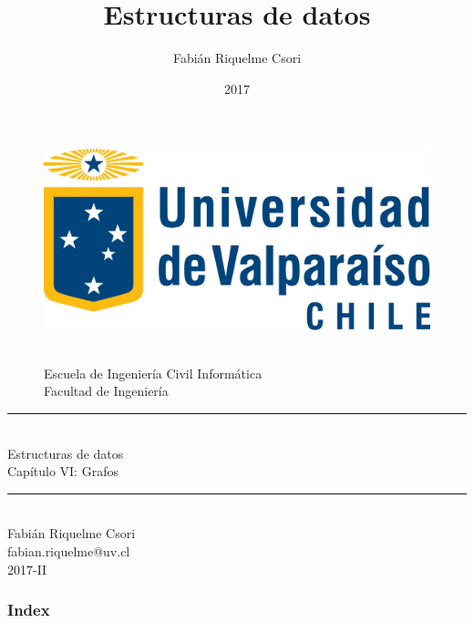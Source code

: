 \documentclass{beamer} %
\title{Estructuras de datos}   %
\author{Fabián Riquelme Csori} %
\date{2017}                    %
\institute{Universidad de Valparaíso}                 %
\newcommand{\HRule}{\rule{\linewidth}{0.2mm}\\[1ex]}
\begin{document}
%

\begin{frame}[plain]
  \begin{figure}[h]
    \begin{minipage}{0.3\textwidth}
    \includegraphics[width=.9\textwidth]{./image/logo-UV.png}
    \end{minipage}
    \begin{minipage}{0.65\textwidth}
     $~$\\[3.6ex]
     \footnotesize{Escuela de Ingeniería Civil Informática}\\
     \footnotesize{Facultad de Ingeniería}
    \end{minipage}
  \end{figure}
  \begin{center}
    \vspace{1ex}
    \HRule
    \Large{Estructuras de datos}\\{\small Capítulo VI: Grafos}\\[-1ex]
    \HRule\vspace{1ex}
    \large{Fabián Riquelme Csori}\\[.5ex]\footnotesize{fabian.riquelme@uv.cl}\\[6ex] {\tiny 2017-II}\\[6ex]
  \end{center}
\end{frame}

\begin{frame}
 \frametitle{Index}
 \scriptsize 			%
 \tableofcontents		%
\end{frame}
\end{document}
